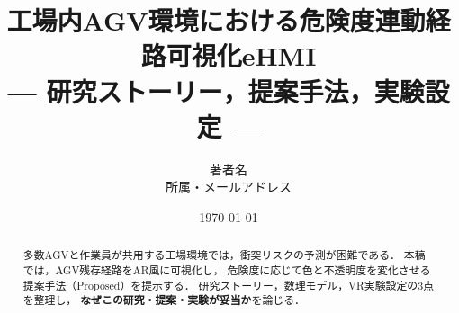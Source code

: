 \documentclass[a4paper,11pt,dvipdfmx]{jlreq}
\title{%
  工場内AGV環境における危険度連動経路可視化eHMI\\%
  --- 研究ストーリー，提案手法，実験設定 ---
}
\author{著者名 \\ \small 所属・メールアドレス}
\date{\today}
\begin{document}
\maketitle

\begin{abstract}
  多数AGVと作業員が共用する工場環境では，衝突リスクの予測が困難である．
  本稿では，AGV残存経路をAR風に可視化し，
  危険度に応じて色と不透明度を変化させる提案手法（Proposed）を提示する．
  研究ストーリー，数理モデル，VR実験設定の3点を整理し，
  \textbf{なぜこの研究・提案・実験が妥当か}を論じる．
\end{abstract}




\end{document}
